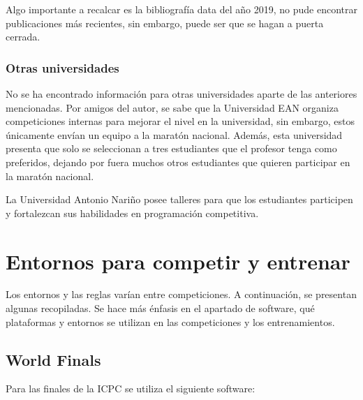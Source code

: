 \documentclass[12pt]{article}
\begin{document}
Algo importante a recalcar es la bibliografía data del año 2019, no pude encontrar publicaciones más recientes, sin embargo, puede ser que se hagan a puerta cerrada.

\subsubsection{Otras universidades}

No se ha encontrado información para otras universidades aparte de las anteriores mencionadas. Por amigos del autor, se sabe que la Universidad EAN organiza competiciones internas para mejorar el nivel en la universidad, sin embargo, estos únicamente envían un equipo a la maratón nacional. Además, esta universidad presenta que solo se seleccionan a tres estudiantes que el profesor tenga como preferidos, dejando por fuera muchos otros estudiantes que quieren participar en la maratón nacional\cite{roa}.

La Universidad Antonio Nariño posee talleres para que los estudiantes participen y fortalezcan sus habilidades en programación competitiva\cite{carlos}.


\section{Entornos para competir y entrenar}

Los entornos y las reglas varían entre competiciones. A continuación, se presentan algunas recopiladas. Se hace más énfasis en el apartado de software, qué plataformas y entornos se utilizan en las competiciones y los entrenamientos.



\subsection{World Finals}

Para las finales de la ICPC se utiliza el siguiente software\cite{icpc-finals}:
\end{document}
